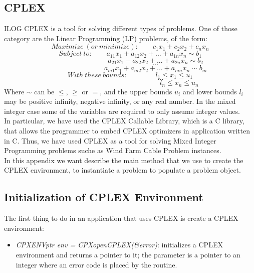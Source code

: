 
\begin{appendices}
\chapter{CPLEX}
ILOG CPLEX is a tool for solving different types of problems. One of those category are the Linear Programming (LP) problems, of the form:
\[
Maximize \ (or \ minimize): \quad \quad c_1 x_1 + c_2 x_2 + c_n x_n 
\]
\[
Subject \ to: \quad \quad a_{11} x_1 + a_{12} x_2 + ... + a_{1n} x_n \sim b_1 
\]
\[
\qquad \qquad \qquad \quad \ a_{21} x_1 + a_{22} x_2 + ... + a_{2n} x_n \sim b_2
\]
\[
\qquad \qquad \qquad \quad \ ...
\]
\[
\qquad \qquad \qquad \quad \ a_{m1} x_1 + a_{m2} x_2 + ... + a_{mn} x_n \sim b_m
\]
\[
With \ these \ bounds: \qquad \qquad l_1 \leq x_1 \leq u_1
\]
\[
\qquad \qquad \qquad \qquad \ \ \  ...
\]
\[
\qquad \qquad \qquad \qquad \qquad \qquad \qquad l_n \leq x_n \leq u_n
\]
Where $\sim$ can be $\leq$, $\geq$ or $=$, and the upper bounds $u_i$ and lower bounds $l_i$ may be positive infinity, negative infinity, or any real number. In the mixed integer case some of the variables are required to only assume integer values.\\
In particular, we have used the \textsc{CPLEX} Callable Library, which is a C library, that allows the programmer to embed \textsc{CPLEX} optimizers in application written in C. Thus, we have used \textsc{CPLEX} as a tool for solving Mixed Integer Programming problems suche as Wind Farm Cable Problem instances.\\
In this appendix we want describe the main method that we use to create the \textsc{CPLEX} environment, to instantiate a problem to populate a problem object.

\section{Initialization of \textsc{CPLEX} Environment}
The first thing to do in an application that uses \textsc{CPLEX} is create a \textsc{CPLEX} environment:
\begin{itemize}
\item \textit{CPXENVptr env = CPXopenCPLEX(\&error)}: initializes a \textsc{CPLEX} environment and returns a pointer to it; the parameter is a pointer to an integer where an error code is placed by the routine.
\end{itemize}


\end{appendices}
